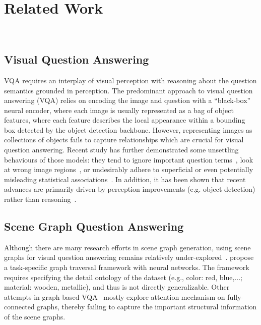 \documentclass[11pt]{article}
\begin{document}



\appendix



\section{Related Work}
~\label{sec:related}


\subsection{Visual Question Answering}
VQA requires an interplay of visual perception with reasoning about the question semantics grounded in perception.
The predominant approach to visual question answering (VQA) relies on encoding the image and question with a ``black-box'' neural encoder, where each image is usually represented as a bag of object features, where each feature describes the local appearance within a bounding box detected by the object detection backbone. 
However, representing images as collections of objects fails to capture relationships which are crucial for visual question answering. 
Recent study has further demonstrated some unsettling behaviours of those models: they tend to ignore important question terms~\cite{DBLP:conf/acl/MudrakartaTSD18}, look at wrong image regions~\cite{DBLP:conf/emnlp/DasAZPB16}, or undesirably adhere to superficial or even potentially misleading statistical associations~\cite{DBLP:conf/emnlp/AgrawalBP16}. 
In addition, it has been shown that recent advances are primarily driven by perception improvements (e.g. object detection) rather than reasoning~\cite{DFOL}. 




\subsection{Scene Graph Question Answering}
Although there are many research efforts in scene graph generation, using scene graphs for visual question answering remains relatively under-explored~\cite{NSM,LCGN,DBLP:conf/iccv/LiGCL19,DBLP:journals/corr/abs-2011-10731}. 
\citet{NSM} propose a task-specific graph traversal framework with neural networks. The framework requires specifying the detail ontology of the dataset (e.g., color: red, blue,...; material: wooden, metallic), and thus is not directly generalizable. 
Other attempts in graph based VQA~\cite{LCGN,DBLP:conf/iccv/LiGCL19} 
mostly explore attention mechanism on fully-connected graphs, thereby failing to capture the important structural information of the scene graphs. 
\end{document}
